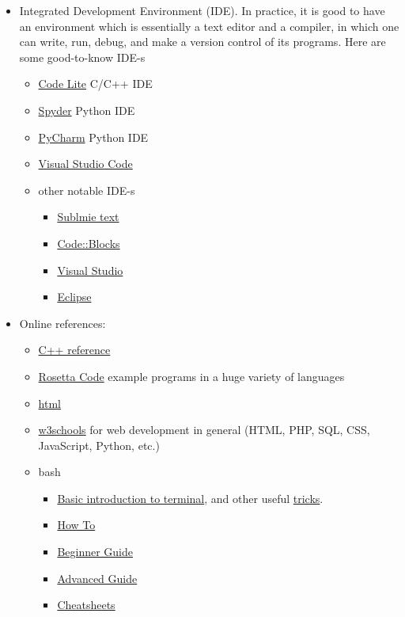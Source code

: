 \documentclass{article}
\begin{document}
\begin{itemize}
    
    \item Integrated Development Environment (IDE). In practice, it is good to have an environment which is essentially a text editor and a compiler, in which one can write, run, debug, and make a version control of its programs. Here are some good-to-know IDE-s
    \begin{itemize}
        \item \href{https://codelite.org/}{Code Lite} C/C++ IDE
        \item \href{https://www.spyder-ide.org/}{Spyder} Python IDE
        \item \href{https://www.jetbrains.com/pycharm/}{PyCharm} Python IDE
        \item \href{https://code.visualstudio.com/}{Visual Studio Code}
        \item other notable IDE-s
        \begin{itemize}
            \item \href{https://www.sublimetext.com/}{Sublmie text}
            \item \href{https://www.codeblocks.org/}{Code::Blocks}
            \item \href{https://visualstudio.microsoft.com/}{Visual Studio}
            \item \href{https://eclipseide.org/}{Eclipse}
        \end{itemize}
    \end{itemize}
    
    \item Online references:
    \begin{itemize}
        \item \href{http://www.cplusplus.com/doc/tutorial/}{C++ reference}
        \item \href{http://rosettacode.org/wiki/Rosetta_Code}{Rosetta Code} example programs in a huge variety of languages
        \item \href{https://www.w3schools.com/html/}{html}
        \item \href{https://www.w3schools.com/}{w3schools} for web development in general (HTML, PHP, SQL, CSS, JavaScript, Python, etc.)
    
        \item bash
        \begin{itemize}
            \item \href{https://www.howtogeek.com/140679/beginner-geek-how-to-start-using-the-linux-terminal/}{Basic introduction to terminal}, and other useful \href{https://itsfoss.com/linux-command-tricks/}{tricks}.
            \item \href{https://tldp.org/HOWTO/Bash-Prog-Intro-HOWTO.html}{How To}
            \item \href{https://www.tldp.org/LDP/Bash-Beginners-Guide/html/}{Beginner Guide}
            \item \href{https://tldp.org/LDP/abs/html/}{Advanced Guide}
            \item \href{https://devhints.io/bash}{Cheatsheets} 
        \end{itemize}
        

\end{itemize}
\end{itemize}
\end{document}
